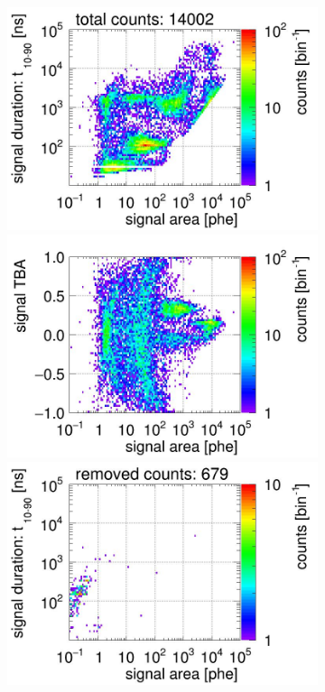 \begin{landscape}
\begin{figure}[!p]
\begin{subfigure}[t]{0.33\textwidth}
		\centering
		\includegraphics[width=\figurewidth,clip,trim={0 98 0 0}]{Figures/GasTest/CutsValid/res64767/pdpa04Vecfig64767.jpg}
		\includegraphics[width=\figurewidth,clip,trim={0 98 0 40}]{Figures/GasTest/CutsValid/res64767/tbapa04Vecfig64767.jpg}
		\includegraphics[width=\figurewidth,clip,trim={0 98 0 10}]{Figures/GasTest/CutsValid/res64767/pdpaX04Vecfig64767.jpg}

\end{subfigure}
\end{figure}
\end{landscape}
